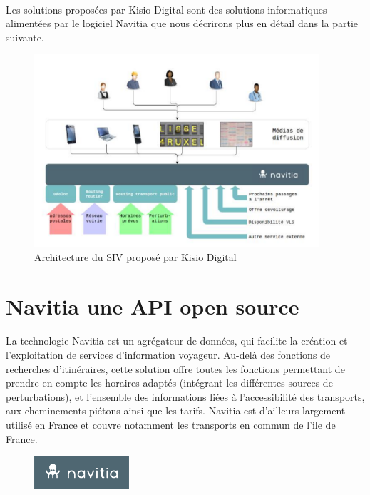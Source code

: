 \documentclass[a4paper]{report}
\begin{document}
\paragraph{} Les solutions proposées par Kisio Digital sont des solutions informatiques alimentées par le logiciel Navitia que nous décrirons plus en détail dans la partie suivante. 

\begin{figure}[H] 
	\begin{center}
		\includegraphics[width=300pt]{image/archi_SIV}
		\caption{Architecture du SIV proposé par Kisio Digital}
		\label{Architecture du SIV proposé par Kisio Digital}
	\end{center}
\end{figure}

\section{Navitia une API open source}

\paragraph{}La technologie Navitia est un agrégateur de données, qui facilite la création et l’exploitation de services d’information voyageur. Au-delà des fonctions de recherches d’itinéraires, cette solution offre toutes les fonctions permettant de prendre en compte les horaires adaptés (intégrant les différentes sources de perturbations), et l’ensemble des informations liées à l’accessibilité des transports, aux cheminements piétons ainsi que les tarifs. Navitia est d’ailleurs largement utilisé en France et couvre notamment les transports en commun de l’ile de France.  

\begin{figure}[H] 
	\begin{center}
		\includegraphics[width=100pt]{image/logo_navitia}
	\end{center}
\end{figure}
\end{document}
